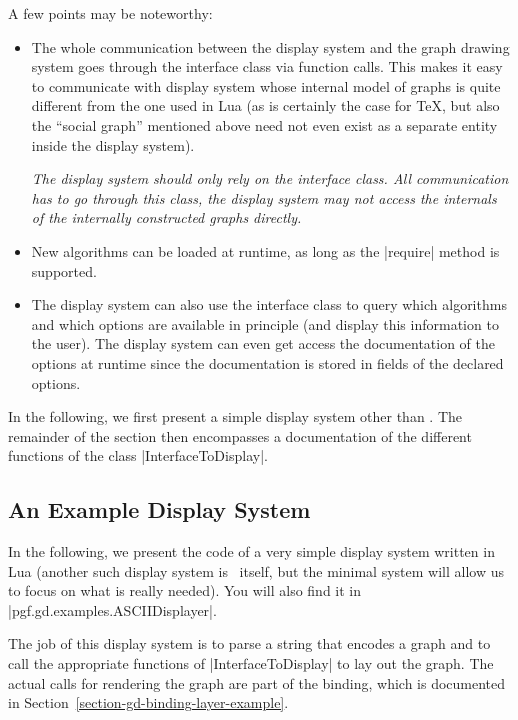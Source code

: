 A few points may be noteworthy:
\begin{itemize}
\item The whole communication between the display system and the graph
  drawing system goes through the interface class via function
  calls. This makes it easy to communicate with display system whose
  internal model of graphs is quite different from the one used in Lua
  (as is certainly the case for \TeX, but also the ``social graph''
  mentioned above need not even exist as a separate entity inside the
  display system).
  
  \emph{The display system should only rely on the interface
    class. All communication has to go through this class, the
    display system may not access the internals of the internally
    constructed graphs directly.}
\item New algorithms can be loaded at runtime, as long as the
  |require| method is supported.
\item The display system can also use the interface class to query which
  algorithms and which options are available in principle (and display
  this information to the user). The display system can even get access the
  documentation of the options at runtime since the documentation is
  stored in fields of the declared options.
\end{itemize}


In the following, we first present a simple display system other than
\tikzname. The remainder of the section then encompasses a
documentation of the different functions of the class
|InterfaceToDisplay|. 



\subsection{An Example Display System}

In the following, we present the code of a very simple display system
written in Lua (another such display system is \tikzname\ itself, but
the minimal system will allow us to focus on what is really
needed). You will also find it in |pgf.gd.examples.ASCIIDisplayer|. 

The job of this display system is to parse a string that encodes a graph
and to call the appropriate functions of |InterfaceToDisplay| to lay
out the graph. The actual calls for rendering the graph are part of
the binding, which is documented in
Section~\ref{section-gd-binding-layer-example}.


